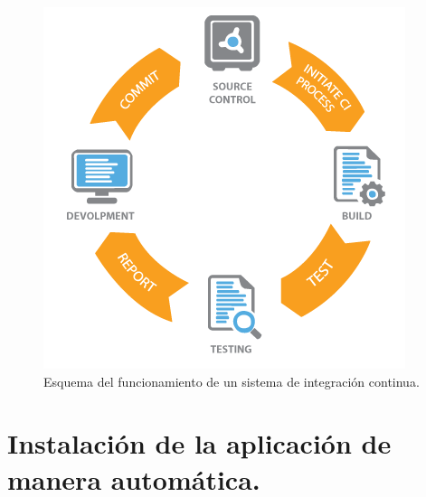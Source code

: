 \begin{figure}[H]
	\centering
	\includegraphics[scale=0.6]{imagenes/continuous-integration.png}
	\caption{Esquema del funcionamiento de un sistema de integración continua. \label{fig:figura14}}
\end{figure}

\section{Instalación de la aplicación de manera automática.}


